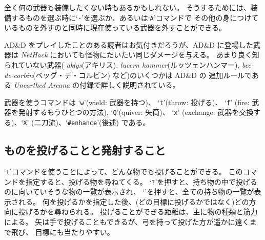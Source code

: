 全く何の武器も装備したくない時もあるかもしれない。
そうするためには、装備するものを選ぶ時に`{\tt -}'を選ぶか、あるいは`{\tt A}'コマンドで
その他の身につけているものを外すのと同時に現在使っている武器を外すことができる。

AD\&D をプレイしたことのある読者はお気付きだろうが、AD\&D に登場した武器は
{\it NetHack\/} においても怪物にだいたい同じダメージを与える。
あまり良く知られていない武器(
{\it aklys}(アキリス), {\it lucern hammer}(ルッツェンハンマー),
{\it bec-de-corbin\/}(ベッグ・デ・コルビン) など)のいくつかは AD\&D の
追加ルールである {\it Unearthed Arcana} の付録で詳しく説明されている。

武器を使うコマンドは `{\tt w}'(wield: 武器を持つ)、 `{\tt t}'(throw: 投げる)、
`{\tt f}' (fire: 武器を発射するもうひとつの方法), `{\tt Q}'(quiver: 矢筒)、
`{\tt x}' (exchange: 武器を交換する)、`{\tt X}' (二刀流)、`{\tt \#enhance}'(後述) である。

\subsection*{ものを投げることと発射すること}

`{\tt t}'コマンドを使うことによって、どんな物でも投げることができる。
このコマンドを指定すると、投げる物を尋ねてくる。
`{\tt ?}'を押すと、持ち物の中で投げるのに向いていそうな物の一覧が表示され、
`{\tt *}'を押すと、全ての持ち物の一覧が表示される。
何を投げるかを指定した後、(どの目標に投げるかではなく)どの方向に投げるかを尋ねられる。
投げることができる距離は、主に物の種類と筋力による。
矢は手で投げることもできるが、弓を持って投げた方が遥かに遠くまで飛び、
目標にも当たりやすい。

